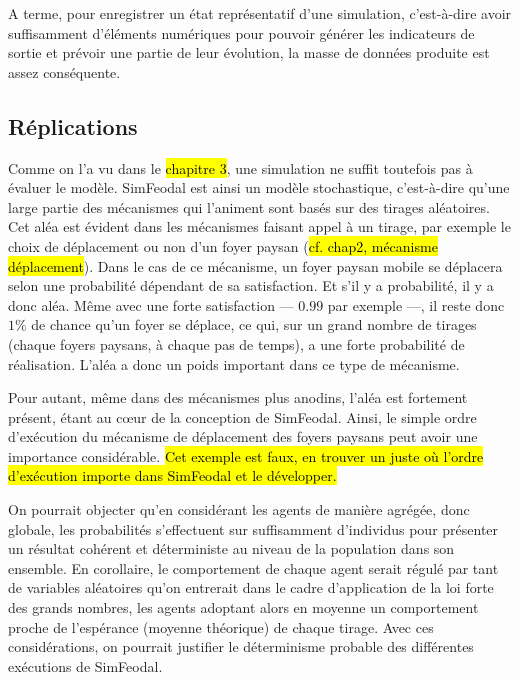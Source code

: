 	A terme, pour enregistrer un état représentatif d'une simulation, c'est-à-dire avoir suffisamment d'éléments numériques pour pouvoir générer les indicateurs de sortie et prévoir une partie de leur évolution, la masse de données produite est assez conséquente.

	\subsection{Réplications}

	Comme on l'a vu dans le \hl{chapitre 3}, une simulation ne suffit toutefois pas à évaluer le modèle.
	SimFeodal est ainsi un modèle stochastique, c'est-à-dire qu'une large partie des mécanismes qui l'animent sont basés sur des tirages aléatoires.
	Cet aléa est évident dans les mécanismes faisant appel à un tirage, par exemple le choix de déplacement ou non d'un foyer paysan (\hl{cf. chap2, mécanisme déplacement}).
	Dans le cas de ce mécanisme, un foyer paysan mobile se déplacera selon une probabilité dépendant de sa satisfaction.
	Et s'il y a probabilité, il y a donc aléa.
	Même avec une forte satisfaction --- $0.99$ par exemple ---, il reste donc $1\%$ de chance qu'un foyer se déplace, ce qui, sur un grand nombre de tirages (chaque foyers paysans, à chaque pas de temps), a une forte probabilité de réalisation.
	L'aléa a donc un poids important dans ce type de mécanisme.

	Pour autant, même dans des mécanismes plus anodins, l'aléa est fortement présent, étant au cœur de la conception de SimFeodal.
	Ainsi, le simple ordre d’exécution du mécanisme de déplacement des foyers paysans peut avoir une importance considérable.
	\hl{Cet exemple est faux, en trouver un juste où l'ordre d’exécution importe dans SimFeodal et le développer.}

	On pourrait objecter qu'en considérant les agents de manière agrégée, donc globale, les probabilités s'effectuent sur suffisamment d'individus pour présenter un résultat cohérent et déterministe au niveau de la population dans son ensemble.
	En corollaire, le comportement de chaque agent serait régulé par tant de variables aléatoires qu'on entrerait dans le cadre d'application de la loi forte des grands nombres, les agents adoptant alors en moyenne un comportement proche de l’espérance (moyenne théorique) de chaque tirage.
	Avec ces considérations, on pourrait justifier le déterminisme probable des différentes exécutions de SimFeodal.

